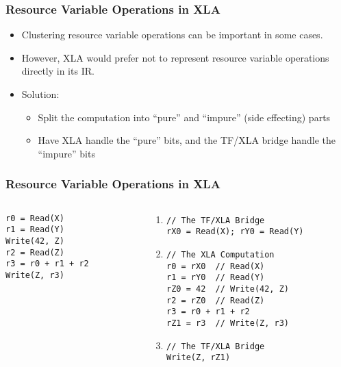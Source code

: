 \documentclass{beamer}
\begin{document}
\begin{frame}[fragile]
  \frametitle{Resource Variable Operations in XLA}

  \begin{itemize}
  \item Clustering resource variable operations can be important in some cases.

  \item However, XLA would prefer not to represent resource variable operations directly in its IR.

  \item Solution:
    \begin{itemize}
    \item Split the computation into ``pure'' and ``impure'' (side effecting) parts
    \item Have XLA handle the ``pure'' bits, and the TF/XLA bridge handle the ``impure'' bits
    \end{itemize}
  \end{itemize}
\end{frame}

\begin{frame}[fragile]
  \frametitle{Resource Variable Operations in XLA}
  \begin{columns}
    \begin{column}{0.28\textwidth}
\begin{verbatim}
r0 = Read(X)
r1 = Read(Y)
Write(42, Z)
r2 = Read(Z)
r3 = r0 + r1 + r2
Write(Z, r3)
\end{verbatim}
    \end{column}
    \vrule{}
    \begin{column}{0.70\textwidth}
      \begin{enumerate}
        \item
\begin{verbatim}
// The TF/XLA Bridge
rX0 = Read(X); rY0 = Read(Y)
\end{verbatim}
        \item
\begin{verbatim}
// The XLA Computation
r0 = rX0  // Read(X)
r1 = rY0  // Read(Y)
rZ0 = 42  // Write(42, Z)
r2 = rZ0  // Read(Z)
r3 = r0 + r1 + r2
rZ1 = r3  // Write(Z, r3)
\end{verbatim}
        \item
\begin{verbatim}
// The TF/XLA Bridge
Write(Z, rZ1)
\end{verbatim}
      \end{enumerate}
    \end{column}
  \end{columns}
\end{frame}
\end{document}
